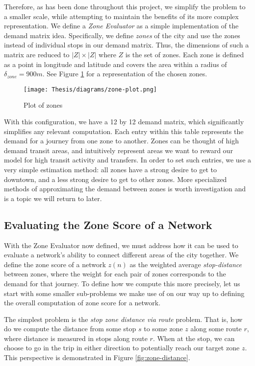 \documentclass[11pt]{amsart}
\theoremstyle{definition}                  %
\theoremstyle{remark}                       %
\numberwithin{equation}{section}
\begin{document}
Therefore, as has been done throughout this project, we simplify the problem to a smaller scale, while attempting to maintain the benefits of its more complex representation. We define a \textit{Zone Evaluator} as a simple implementation of the demand matrix idea. Specifically, we define \textit{zones} of the city and use the zones instead of individual stops in our demand matrix. Thus, the dimensions of such a matrix are reduced to $|Z|\times|Z|$ where $Z$ is the set of zones. Each zone is defined as a point in longitude and latitude and covers the area within a radius of $\delta_{zone} = 900 m$. See Figure \ref{fig:zone-plot} for a representation of the chosen zones. 
\begin{figure}[h]
    \centering
    \texttt{[image: Thesis/diagrams/zone-plot.png]}
    \caption{Plot of zones}
    \label{fig:zone-plot}
\end{figure}
With this configuration, we have a 12 by 12 demand matrix, which significantly simplifies any relevant computation. Each entry within this table represents the demand for a journey from one zone to another. Zones can be thought of high demand transit areas, and intuitively represent areas we want to reward our model for high transit activity and transfers. In order to set such entries, we use a very simple estimation method: all zones have a strong desire to get to downtown, and a less strong desire to get to other zones. More specialized methods of approximating the demand between zones is worth investigation and is a topic we will return to later. 

\subsection{Evaluating the Zone Score of a Network}
With the Zone Evaluator now defined, we must address how it can be used to evaluate a network's ability to connect different areas of the city together. We define the zone score of a network $z(n)$ as the weighted average \textit{stop-distance} between zones, where the weight for each pair of zones corresponds to the demand for that journey. To define how we compute this more precisely, let us start with some smaller sub-problems we make use of on our way up to defining the overall computation of zone score for a network. 

The simplest problem is the \textit{stop zone distance via route} problem. That is, how do we compute the distance from some stop $s$ to some zone $z$ along some route $r$, where distance is measured in stops along route $r$. When at the stop, we can choose to go in the trip in either direction to potentially reach our target zone $z$. This perspective is demonstrated in Figure \ref{fig:zone-distance}. 
\end{document}
